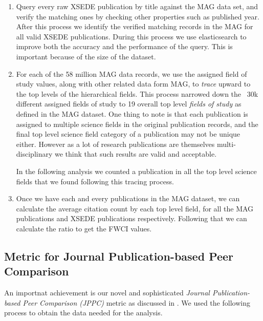 \documentclass[sigconf]{acmart}
\begin{document}
\begin{enumerate}
\item Query every raw XSEDE publication by title against the MAG data
  set, and verify the matching ones by checking other properties such
  as published year. After this process we identify the verified
  matching records in the MAG for all valid XSEDE publications.
  During this process we use elasticsearch
  \cite{gormley2015elasticsearch} to improve both the accuracy and the
  performance of the query.  This is important because of the size of
  the dataset.
\item For each of the 58 million MAG data records, we use the assigned
  field of study values, along with other related data form MAG, to
  \emph{trace} upward to the top levels of the hierarchical
  fields. This process narrowed down the ~30k different assigned
  fields of study to 19 overall top level \emph{fields of study} as
  defined in the MAG dataset.  One thing to note is that each
  publication is assigned to multiple science fields in the original
  publication records, and the final top level science field category
  of a publication may not be unique either. However as a lot of
  research publications are themselves multi-disciplinary we think
  that such results are valid and acceptable.

  In the following analysis we counted a publication in all the top
  level science fields that we found following this tracing process.

\item Once we have each and every publications in the MAG dataset, we
  can calculate the average citation count by each top level field,
  for all the MAG publications and XSEDE publications
  respectively. Following that we can calculate the ratio to get the
  FWCI values.
\end{enumerate}

\subsection{Metric for Journal Publication-based Peer Comparison} \label{S:metric}

An importnat achievement is our novel and sophisticated \emph{Journal
  Publication-based Peer Comparison (JPPC)} metric as discussed in
\cite{tas2015}. We used the following process to obtain the data
needed for the analysis.
\end{document}

